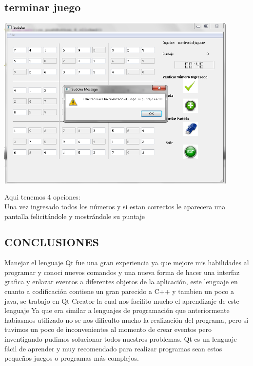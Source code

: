 \documentclass[12pt]{extbook}
\begin{document}
\begin{center}
\section{terminar juego}
\end{center}
\begin{center}
\includegraphics[width=12cm]{felicitaciones1.png}
\end{center}
Aqui tenemos 4 opciones:\\
Una vez ingresado todos los números y si estan correctos le aparecera una pantalla felicitándole y mostrándole su puntaje \\




\begin{center}
\section{CONCLUSIONES}
\end{center}

Manejar el lenguaje Qt fue una gran experiencia ya que mejore mis habilidades al programar y conoci nuevos comandos y una nueva forma de hacer una interfaz grafica y enlazar eventos a diferentes objetos de la aplicación,  este lenguaje en cuanto a codificación contiene un gran parecido a C++ y tambien un poco a java, se trabajo en Qt Creator la cual nos facilito mucho el aprendizaje de este lenguaje 
Ya que era similar a lenguajes de programación que anteriormente habiasmos utilizado no se nos dificulto mucho la realización del programa, pero si tuvimos un poco de inconvenientes al momento de crear eventos pero  inventigando pudimos solucionar todos nuestros problemas.
Qt es un lenguaje fácil de aprender  y muy recomendado para realizar programas sean estos pequeños juegos o programas más complejos.
\end{document}
